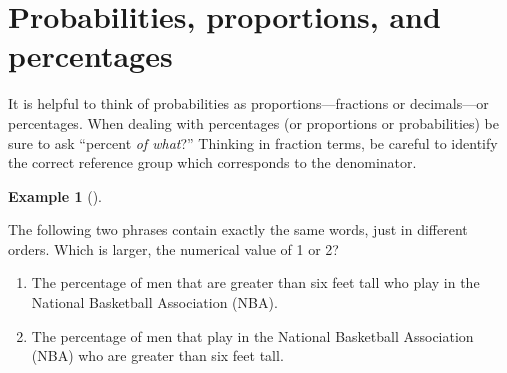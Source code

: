 \documentclass[
  letterpaper,
  DIV=11,
  numbers=noendperiod]{scrreprt}
\providecommand{\tightlist}{%
  \setlength{\itemsep}{0pt}\setlength{\parskip}{0pt}}
\theoremstyle{plain}
\theoremstyle{definition}
\newtheorem{example}{Example}[chapter]
\theoremstyle{definition}
\theoremstyle{definition}
\theoremstyle{remark}
\begin{document}
\section{Probabilities, proportions, and
percentages}\label{probabilities-proportions-and-percentages}

It is helpful to think of probabilities as proportions---fractions or
decimals---or percentages. When dealing with percentages (or proportions
or probabilities) be sure to ask ``percent \emph{of what}?'' Thinking in
fraction terms, be careful to identify the correct reference group which
corresponds to the denominator.

\begin{tcolorbox}[enhanced jigsaw, opacityback=0, left=2mm, colframe=quarto-callout-note-color-frame, toprule=.15mm, breakable, colback=white, leftrule=.75mm, arc=.35mm, rightrule=.15mm, bottomrule=.15mm]

\begin{example}[]\protect\hypertarget{exm-nba-conditional}{}\label{exm-nba-conditional}

The following two phrases contain exactly the same words, just in
different orders. Which is larger, the numerical value of 1 or 2?

\begin{enumerate}
\def\labelenumi{\arabic{enumi}.}
\tightlist
\item
  The percentage of men that are greater than six feet tall who play in
  the National Basketball Association (NBA).
\item
  The percentage of men that play in the National Basketball Association
  (NBA) who are greater than six feet tall.
\end{enumerate}

\end{example}

\end{tcolorbox}
\end{document}
